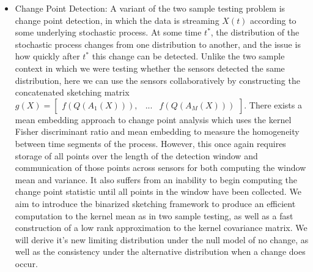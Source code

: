 \begin{itemize}


\item Change Point Detection: A variant of the two sample testing problem is change point detection, in which the data is streaming $X(t)$ according to some underlying stochastic process.  At some time $t^*$, the distribution of the stochastic process changes from one distribution to another, and the issue is how quickly after $t^*$ this change can be detected.   Unlike the two sample context in which we were testing whether the sensors detected the same distribution, here we can use the sensors collaboratively by constructing the concatenated sketching matrix $g(X) = \begin{bmatrix}f(Q(A_1(X))), & ... & f(Q(A_M(X))) \end{bmatrix}$.
There exists a mean embedding approach to change point analysis \cite{Bach 2008} which uses the kernel Fisher discriminant ratio and mean embedding to measure the homogeneity between time segments of the process.  However, this once again requires storage of all points over the length of the detection window and communication of those points across sensors for both computing the window mean and variance. It also suffers from an inability to begin computing the change point statistic until all points in the window have been collected.  We aim to introduce the binarized sketching framework to produce an efficient computation to the kernel mean as in two sample testing, as well as a fast construction of a low rank approximation to the kernel covariance matrix.  We will derive it's new limiting distribution under the null model of no change, as well as the consistency under the alternative distribution when a change does occur.  


\end{itemize}
